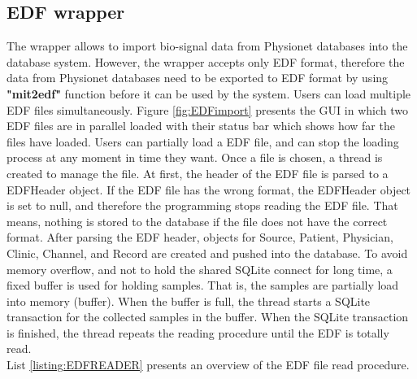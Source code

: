 \subsection{EDF wrapper}
The wrapper allows to import bio-signal data from Physionet databases into the database system. However, the wrapper accepts only EDF format, therefore the data from Physionet databases need to be exported to EDF format by using \textbf{"mit2edf"} function before it can be used by the system. Users can load multiple EDF files simultaneously. Figure \ref{fig:EDFimport} presents the GUI in which two EDF files are in parallel loaded with their status bar which shows how far the files have loaded. Users can partially load a EDF file, and can stop the loading process at any moment in time they want. Once a file is chosen, a thread is created to manage the file. At first, the header of the EDF file is parsed to a EDFHeader object. If the EDF file has the wrong format, the EDFHeader object is set to null, and therefore the programming stops reading the EDF file. That means, nothing is stored to the database if the file does not have the correct format. After parsing the EDF header, objects for Source, Patient, Physician, Clinic, Channel, and Record are created and pushed into the database. To avoid memory overflow, and not to hold the shared SQLite connect for long time, a fixed buffer is used for holding samples. That is, the samples are partially load into memory (buffer). When the buffer is full, the thread starts a SQLite transaction for the collected samples in the buffer. When the SQLite transaction is finished, the thread repeats the reading procedure until the EDF is totally read.\\
List \ref{listing:EDFREADER} presents an overview of the EDF file read procedure.
